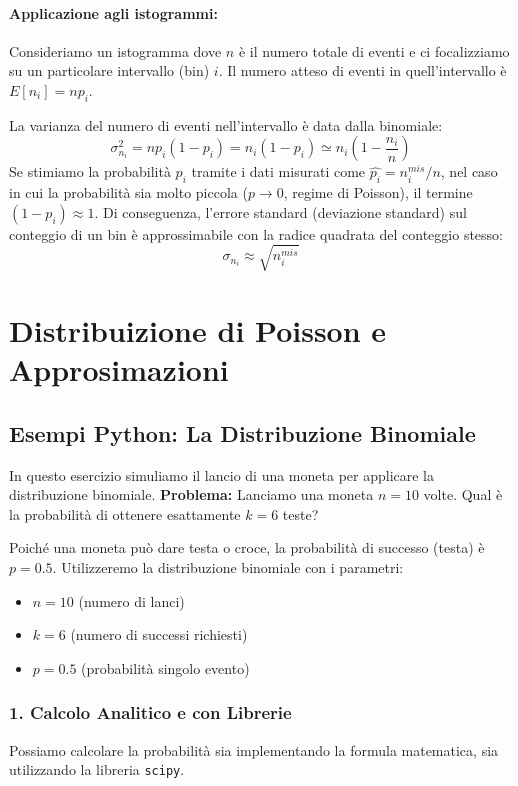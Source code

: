 \documentclass[openany,a4paper,12pt]{book}
\theoremstyle{remark}
\begin{document}
\paragraph{Applicazione agli istogrammi:}
Consideriamo un istogramma dove $n$ è il numero totale di eventi e ci focalizziamo su un particolare intervallo (bin) $i$.
Il numero atteso di eventi in quell'intervallo è $E[n_i] = n p_i$.

La varianza del numero di eventi nell'intervallo è data dalla binomiale:
\[ \sigma_{n_i}^2 = n p_i (1 - p_i) = n_i (1 - p_i) \simeq n_i \left(1 - \frac{n_i}{n}\right) \]
Se stimiamo la probabilità $p_i$ tramite i dati misurati come $\hat{p_i} = n_i^{mis}/n$, nel caso in cui la probabilità sia molto piccola ($p \to 0$, regime di Poisson), il termine $(1-p_i) \approx 1$.
Di conseguenza, l'errore standard (deviazione standard) sul conteggio di un bin è approssimabile con la radice quadrata del conteggio stesso:
\[ \sigma_{n_i} \approx \sqrt{n_i^{mis}} \]

\section{Distribuizione di Poisson e Approsimazioni}

\subsection*{Esempi Python: La Distribuzione Binomiale}

In questo esercizio simuliamo il lancio di una moneta per applicare la distribuzione binomiale.
\textbf{Problema:} Lanciamo una moneta $n=10$ volte. Qual è la probabilità di ottenere esattamente $k=6$ teste?

Poiché una moneta può dare testa o croce, la probabilità di successo (testa) è $p=0.5$. Utilizzeremo la distribuzione binomiale con i parametri:
\begin{itemize}
    \item $n = 10$ (numero di lanci)
    \item $k = 6$ (numero di successi richiesti)
    \item $p = 0.5$ (probabilità singolo evento)
\end{itemize}

\subsubsection*{1. Calcolo Analitico e con Librerie}
Possiamo calcolare la probabilità sia implementando la formula matematica, sia utilizzando la libreria \texttt{scipy}.
\end{document}
